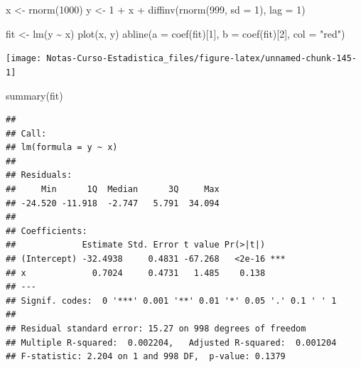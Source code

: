 \documentclass[
  12pt,
]{book}
\newenvironment{Shaded}{\begin{snugshade}}{\end{snugshade}}
\newcommand{\AttributeTok}[1]{\textcolor[rgb]{0.77,0.63,0.00}{#1}}
\newcommand{\DecValTok}[1]{\textcolor[rgb]{0.00,0.00,0.81}{#1}}
\newcommand{\FunctionTok}[1]{\textcolor[rgb]{0.00,0.00,0.00}{#1}}
\newcommand{\NormalTok}[1]{#1}
\newcommand{\OtherTok}[1]{\textcolor[rgb]{0.56,0.35,0.01}{#1}}
\newcommand{\SpecialCharTok}[1]{\textcolor[rgb]{0.00,0.00,0.00}{#1}}
\newcommand{\StringTok}[1]{\textcolor[rgb]{0.31,0.60,0.02}{#1}}
\begin{document}
\begin{Shaded}
\begin{Highlighting}[]
\NormalTok{x }\OtherTok{\textless{}{-}} \FunctionTok{rnorm}\NormalTok{(}\DecValTok{1000}\NormalTok{)}
\NormalTok{y }\OtherTok{\textless{}{-}} \DecValTok{1} \SpecialCharTok{+}\NormalTok{ x }\SpecialCharTok{+} \FunctionTok{diffinv}\NormalTok{(}\FunctionTok{rnorm}\NormalTok{(}\DecValTok{999}\NormalTok{, }\AttributeTok{sd =} \DecValTok{1}\NormalTok{), }\AttributeTok{lag =} \DecValTok{1}\NormalTok{)}
\end{Highlighting}
\end{Shaded}

\begin{Shaded}
\begin{Highlighting}[]
\NormalTok{fit }\OtherTok{\textless{}{-}} \FunctionTok{lm}\NormalTok{(y }\SpecialCharTok{\textasciitilde{}}\NormalTok{ x)}
\FunctionTok{plot}\NormalTok{(x, y)}
\FunctionTok{abline}\NormalTok{(}\AttributeTok{a =} \FunctionTok{coef}\NormalTok{(fit)[}\DecValTok{1}\NormalTok{], }\AttributeTok{b =} \FunctionTok{coef}\NormalTok{(fit)[}\DecValTok{2}\NormalTok{], }\AttributeTok{col =} \StringTok{"red"}\NormalTok{)}
\end{Highlighting}
\end{Shaded}

\begin{center}\texttt{[image: Notas-Curso-Estadistica\_files/figure-latex/unnamed-chunk-145-1]} \end{center}

\begin{Shaded}
\begin{Highlighting}[]
\FunctionTok{summary}\NormalTok{(fit)}
\end{Highlighting}
\end{Shaded}

\begin{verbatim}
## 
## Call:
## lm(formula = y ~ x)
## 
## Residuals:
##     Min      1Q  Median      3Q     Max 
## -24.520 -11.918  -2.747   5.791  34.094 
## 
## Coefficients:
##             Estimate Std. Error t value Pr(>|t|)    
## (Intercept) -32.4938     0.4831 -67.268   <2e-16 ***
## x             0.7024     0.4731   1.485    0.138    
## ---
## Signif. codes:  0 '***' 0.001 '**' 0.01 '*' 0.05 '.' 0.1 ' ' 1
## 
## Residual standard error: 15.27 on 998 degrees of freedom
## Multiple R-squared:  0.002204,   Adjusted R-squared:  0.001204 
## F-statistic: 2.204 on 1 and 998 DF,  p-value: 0.1379
\end{verbatim}
\end{document}
